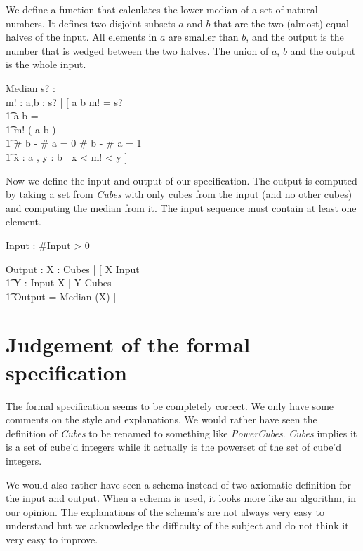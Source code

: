 \documentclass[12pt]{article}
\begin{document}
We define a function that calculates the lower median of a set of natural numbers. It defines two disjoint subsets $a$ and $b$ that are the two (almost) equal halves of the input. All elements in $a$ are smaller than $b$, and the output is the number that is wedged between the two halves. The union of $a$, $b$ and the output is the whole input.
\begin{schema}{Median}
s? : \power \nat \\
m! : \nat
\where
\exists a,b : \power s? | [ \: a \union b \union m! = s? \\
                          \t1 a \cap b = \emptyset \\
                          \t1 m! \notin ( a \union b ) \\
                          \t1 \# b - \# a = 0 \: \vee \# b - \# a = 1 \\
                          \t1 \forall x : a , y : b | x < m! < y \: ]
\end{schema}

Now we define the input and output of our specification. The output is computed by taking a set from \textsl{Cubes} with only cubes from the input (and no other cubes) and computing the median from it. The input sequence must contain at least one element.
\begin{axdef}
Input : \seq \nat
\where
\#Input > 0
\end{axdef}

\begin{axdef}
Output : \nat
\where
\exists X : Cubes | [ \: X \subseteq \ran Input \\ \t1 \forall Y : \ran Input \setminus X | Y \not\subseteq Cubes \\ \t1 Output = Median (X) \: ]
\end{axdef}

\section{Judgement of the formal specification}
The formal specification seems to be completely correct. We only have some comments on the style and explanations. We would rather have seen the definition of \textsl{Cubes} to be renamed to something like \textsl{PowerCubes}. \textsl{Cubes} implies it is a set of cube'd integers while it actually is the powerset of the set of cube'd integers.

We would also rather have seen a schema instead of two axiomatic definition for the input and output. When a schema is used, it looks more like an algorithm, in our opinion. The explanations of the schema's are not always very easy to understand but we acknowledge the difficulty of the subject and do not think it very easy to improve.
\end{document}
